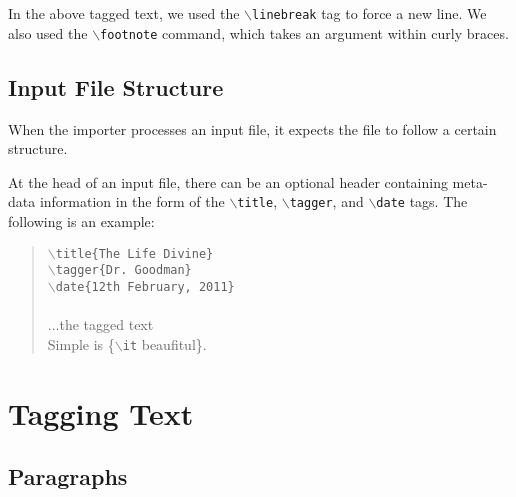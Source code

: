 \documentclass[11pt]{article}
\newcommand{\cmd}[1]{{\tt $\backslash$#1}}
\begin{document}
In the above tagged text, we used the \cmd{linebreak} tag to force a new
line. We also used the \cmd{footnote} command, which takes an argument
within curly braces.









\subsection{Input File Structure}

When the importer processes an input file, it expects the file to
follow a certain structure.

At the head of an input file, there can be an optional header
containing meta-data information in the form of the \cmd{title},
\cmd{tagger}, and \cmd{date} tags. The following is an example:

\begin{quote}
  \cmd{title\{The Life Divine\}}\\
  \cmd{tagger\{Dr. Goodman\}}\\
  \cmd{date\{12th February, 2011\}}\\
\\
  ...the tagged text \\
  Simple is \{\cmd{it} beaufitul\}.\\
\end{quote}


\section{Tagging Text}

\subsection{Paragraphs}
\end{document}
